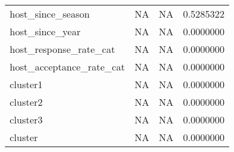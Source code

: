 \begin{tabular}[t]{lrrr}
host\_since\_season & NA & NA & 0.5285322\\
host\_since\_year & NA & NA & 0.0000000\\
host\_response\_rate\_cat & NA & NA & 0.0000000\\
\addlinespace
host\_acceptance\_rate\_cat & NA & NA & 0.0000000\\
cluster1 & NA & NA & 0.0000000\\
cluster2 & NA & NA & 0.0000000\\
cluster3 & NA & NA & 0.0000000\\
cluster & NA & NA & 0.0000000\\
\bottomrule
\end{tabular}
